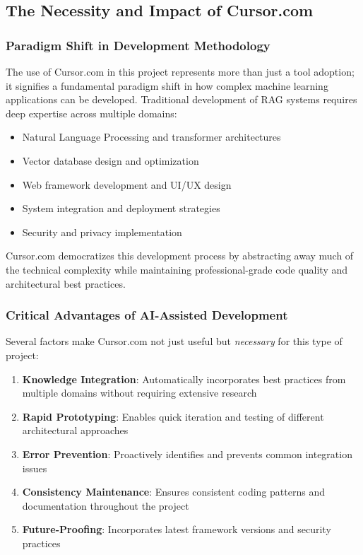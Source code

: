 \subsection{The Necessity and Impact of Cursor.com}

\subsubsection{Paradigm Shift in Development Methodology}

The use of Cursor.com in this project represents more than just a tool adoption; it signifies a fundamental paradigm shift in how complex machine learning applications can be developed. Traditional development of RAG systems requires deep expertise across multiple domains:

\begin{itemize}
    \item Natural Language Processing and transformer architectures
    \item Vector database design and optimization
    \item Web framework development and UI/UX design
    \item System integration and deployment strategies
    \item Security and privacy implementation
\end{itemize}

Cursor.com democratizes this development process by abstracting away much of the technical complexity while maintaining professional-grade code quality and architectural best practices.

\subsubsection{Critical Advantages of AI-Assisted Development}

Several factors make Cursor.com not just useful but \textit{necessary} for this type of project:

\begin{enumerate}
    \item \textbf{Knowledge Integration}: Automatically incorporates best practices from multiple domains without requiring extensive research
    \item \textbf{Rapid Prototyping}: Enables quick iteration and testing of different architectural approaches
    \item \textbf{Error Prevention}: Proactively identifies and prevents common integration issues
    \item \textbf{Consistency Maintenance}: Ensures consistent coding patterns and documentation throughout the project
    \item \textbf{Future-Proofing}: Incorporates latest framework versions and security practices
\end{enumerate}

